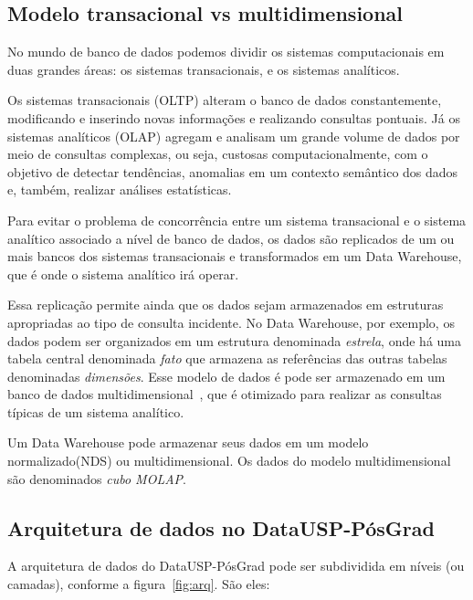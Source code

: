 \subsection{Modelo transacional vs multidimensional}
\label{sub:multi}
No mundo de banco de dados podemos dividir os sistemas computacionais em duas grandes áreas: os sistemas transacionais, e os sistemas analíticos. 
\par
Os sistemas transacionais (OLTP) alteram o banco de dados constantemente, modificando e inserindo novas informações e realizando consultas pontuais. Já os sistemas analíticos (OLAP) agregam e analisam um grande volume de dados por meio de consultas complexas, ou seja, custosas computacionalmente, com o objetivo de detectar tendências, anomalias em um contexto semântico dos dados e, também, realizar análises estatísticas.
\par
Para evitar o problema de concorrência entre um sistema transacional e o sistema analítico associado a nível de banco de dados, os dados são replicados de um ou mais bancos dos sistemas transacionais e transformados em um Data Warehouse, que é onde o sistema analítico irá operar.
\par
Essa replicação permite ainda que os dados sejam armazenados em estruturas apropriadas ao tipo de consulta incidente. No Data Warehouse, por exemplo, os dados podem ser organizados em um estrutura denominada \emph{estrela}, onde há uma tabela central denominada \emph{fato} que armazena as referências das outras tabelas denominadas \emph{dimensões}. Esse modelo de dados é pode ser armazenado em um banco de dados multidimensional~\cite{VR}, que é otimizado para realizar as consultas típicas de um sistema analítico.
\par
Um Data Warehouse pode armazenar seus dados em um modelo normalizado(NDS) ou multidimensional. Os dados do modelo multidimensional são denominados \emph{cubo MOLAP}.

\subsection{Arquitetura de dados no DataUSP-PósGrad}
A arquitetura de dados do DataUSP-PósGrad pode ser subdividida em níveis (ou camadas), conforme a figura~\ref{fig:arq}. São eles:

